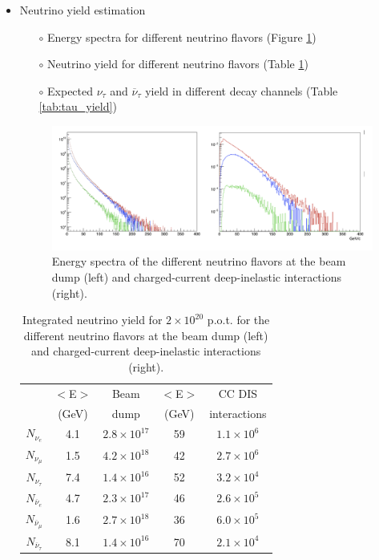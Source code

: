\begin{itemize}
    \item Neutrino yield estimation
        \begin{itemize}
        \item[$\circ$] Energy spectra for different neutrino flavors  (Figure \ref{fig:neu_spectra})
        \item[$\circ$] Neutrino yield for different neutrino flavors  (Table \ref{tab:neu_yield})
        \item[$\circ$] Expected $\nu_\tau$ and $\overline{\nu}_\tau$ yield in different decay channels
         (Table \ref{tab:tau_yield})
        \end{itemize}

 \begin{figure}[htbp]
    \centering  
    \includegraphics[scale=0.4]{figs/PhysicsPerformance/neu_spectra.png}
    \caption{Energy spectra of the different neutrino flavors  at the beam dump (left) and charged-current deep-inelastic interactions (right).}
    \label{fig:neu_spectra}
    \end{figure}
    
\begin{table}[htp]
\begin{center}
\begin{tabular}{c | c c  | c c  }
\hline
& $<$E$>$  & Beam  & $<$E$>$ &  CC DIS\\
&       (GeV) & dump  & (GeV) & interactions \\
 \hline
 $N_{\nu_e}$                 & 4.1 & $2.8 \times 10^{17}$    & 59 & $1.1 \times 10^{6}$ \\
 $N_{\nu_\mu}$               & 1.5 & $4.2 \times 10^{18}$    & 42 & $2.7 \times 10^{6}$ \\
 $N_{\nu_\tau}$              & 7.4 & $1.4 \times 10^{16}$    & 52 & $3.2 \times 10^{4}$ \\
 $N_{\overline{\nu}_e}$      & 4.7 & $2.3 \times 10^{17}$    & 46 & $2.6 \times 10^{5}$ \\
 $N_{\overline{\nu}_\mu}$    & 1.6 & $2.7 \times 10^{18}$    & 36 & $6.0 \times 10^{5}$ \\
 $N_{\overline{\nu}_\tau}$   & 8.1 & $1.4 \times 10^{16}$    & 70 & $2.1 \times 10^{4}$ \\
 \hline
\end{tabular}
\end{center}
\caption{Integrated neutrino yield for $2\times10^{20}$ p.o.t. for the  different neutrino flavors at the beam dump (left) and charged-current deep-inelastic interactions (right).}
\label{tab:neu_yield}
\end{table}


\end{itemize}
